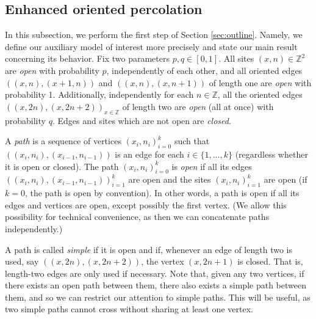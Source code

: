 \documentclass[pdflatex,sn-mathphys-num]{sn-jnl}%
\newcommand{\bbZ}{{\ensuremath{\mathbb Z}} }
\newcommand{\1}{{\ensuremath{\mathbf{1}}} }
\theoremstyle{thmstyleone}%
\theoremstyle{thmstyletwo}%
\theoremstyle{thmstylethree}%
\begin{document}
\subsection{Enhanced oriented percolation} 
In this subsection, we perform the first step of Section \ref{sec:outline}. Namely, we define our auxiliary model of interest more precisely and state our main result concerning its behavior. Fix two parameters $p,q\in [0,1]$. All sites $(x,n)\in \mathbb Z^{{2}}$ are {\it open} with probability $p$,  independently of each other, and 
all oriented edges $((x,n),(x+1,n))$ and 
$((x,n),(x,n+1))$ 
of length one 
are {\it open} with probability 1. 
Additionally, independently for each $n \in\bbZ$, all the oriented edges $((x,2n),(x,2n+2))_{x\in\bbZ}$ 
of length two 
are \emph{open} 
(all at once)
with probability $q$. Edges and sites which are not open are  \emph{closed}.


A \emph{path} is a sequence of vertices $(x_i,n_i)_{i=0}^k$ such that $((x_i,n_i),(x_{i-1},n_{i-1}))$ is an edge for each $i\in\{1,\dots,k\}$ (regardless whether it is open or closed). The path $(x_i,n_i)_{i=0}^k$ is \emph{open} if all its edges $((x_i,n_i),(x_{i-1},n_{i-1}))_{i=1}^k$ are open and the sites $(x_i,n_i)_{i=1}^k$ are open (if $k=0$, the path is open by convention). In other words, a path is open if all its
edges and vertices are open, except possibly
the first vertex. (We allow this possibility 
for technical convenience, as then 
we can concatenate paths independently.)

A path is called \emph{simple} if it is open and if, whenever 
an edge of length two is used, say $((x,2n),(x,2n+2))$, 
the vertex $(x,2n+1)$ is closed. 
That is, length-two edges are only used if necessary. 
Note that, given any two vertices, if there exists an open path between them, there also exists a simple path between them, and so we can restrict our attention to simple paths. 
This will be useful, as 
two simple paths cannot cross without sharing at least one vertex. 
\end{document}
